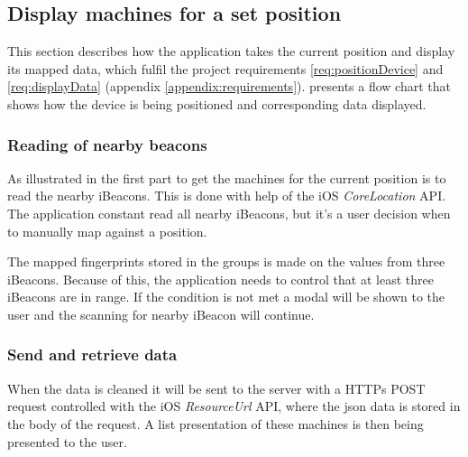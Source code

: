 \subsection{Display machines for a set position}\label{sec:implAppSetPos}
This section describes how the application takes the current position and display its mapped data, which fulfil the project requirements \ref{req:positionDevice} and \ref{req:displayData} (appendix \ref{appendix:requirements}).
 presents a flow chart that shows how the device is being positioned and corresponding data displayed.



\subsubsection{Reading of nearby beacons}\label{sec:implAppSetPosReadBeacons}
As illustrated in  the first part to get the machines for the current position is to read the nearby iBeacons.
This is done with help of the iOS \textit{CoreLocation} API.
The application constant read all nearby iBeacons, but it's a user decision when to manually map against a position.

\bigskip

The mapped fingerprints stored in the groups is made on the values from three iBeacons.
Because of this, the application needs to control that at least three iBeacons are in range.
If the condition is not met a modal will be shown to the user and the scanning for nearby iBeacon will continue.


\subsubsection{Send and retrieve data}\label{sec:implAppSetPosSendRetreiveData}
When the data is cleaned it will be sent to the server with a HTTPs POST request controlled with the iOS \textit{ResourceUrl} API, where the \acrshort{json} data is stored in the body of the request.
A list presentation of these machines is then being presented to the user.


